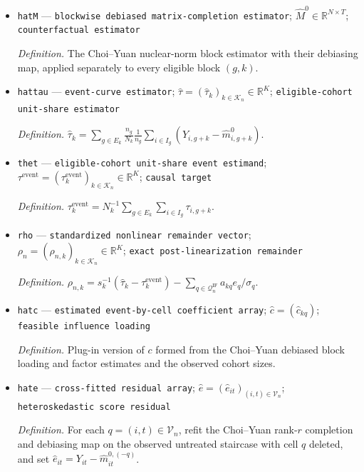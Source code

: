 \documentclass{article}
\begin{document}
\begin{itemize}
  \par\smallskip\noindent\emph{Definition.} \texttt{Gaussian vector with the full staircase correlation matrix.}
  \item \texttt{hatM} --- \texttt{blockwise debiased matrix-\allowbreak{}completion estimator}; \(\widehat M^0\in\mathbb R^{N\times T}\); \texttt{counterfactual estimator}
  \par\smallskip\noindent\emph{Definition.} The Choi--Yuan nuclear-norm block estimator with their debiasing map, applied separately to every eligible block \((g,k)\).
  \item \texttt{hattau} --- \texttt{event-\allowbreak{}curve estimator}; \(\widehat\tau=(\widehat\tau_k)_{k\in\mathcal K_n}\in\mathbb R^K\); \texttt{eligible-\allowbreak{}cohort unit-\allowbreak{}share estimator}
  \par\smallskip\noindent\emph{Definition.} \(\widehat\tau_k=\sum_{g\in E_k}\frac{n_g}{N_k}\frac{1}{n_g}\sum_{i\in I_g}(Y_{i,g+k}-\widehat m^0_{i,g+k})\).
  \item \texttt{thet} --- \texttt{eligible-\allowbreak{}cohort unit-\allowbreak{}share event estimand}; \(\tau^{\mathrm{event}}=(\tau_k^{\mathrm{event}})_{k\in\mathcal K_n}\in\mathbb R^K\); \texttt{causal target}
  \par\smallskip\noindent\emph{Definition.} \(\tau_k^{\mathrm{event}}=N_k^{-1}\sum_{g\in E_k}\sum_{i\in I_g}\tau_{i,g+k}\).
  \item \texttt{rho} --- \texttt{standardized nonlinear remainder vector}; \(\rho_n=(\rho_{n,k})_{k\in\mathcal K_n}\in\mathbb R^K\); \texttt{exact post-\allowbreak{}linearization remainder}
  \par\smallskip\noindent\emph{Definition.} \(\rho_{n,k}=s_k^{-1}(\widehat\tau_k-\tau_k^{\mathrm{event}})-\sum_{q\in\mathcal Q_n^{\mathrm{IF}}}a_{kq}e_q/\sigma_q\).
  \item \texttt{hatc} --- \texttt{estimated event-\allowbreak{}by-\allowbreak{}cell coefficient array}; \(\widehat c=(\widehat c_{kq})\); \texttt{feasible influence loading}
  \par\smallskip\noindent\emph{Definition.} Plug-in version of \(c\) formed from the Choi--Yuan debiased block loading and factor estimates and the observed cohort sizes.
  \item \texttt{hate} --- \texttt{cross-\allowbreak{}fitted residual array}; \(\widehat e=(\widehat e_{it})_{(i,t)\in\mathcal V_n}\); \texttt{heteroskedastic score residual}
  \par\smallskip\noindent\emph{Definition.} For each \(q=(i,t)\in\mathcal V_n\), refit the Choi--Yuan rank-\(r\) completion and debiasing map on the observed untreated staircase with cell \(q\) deleted, and set \(\widehat e_{it}=Y_{it}-\widehat m_{it}^{0,(-q)}\).

\end{itemize}
\end{document}
